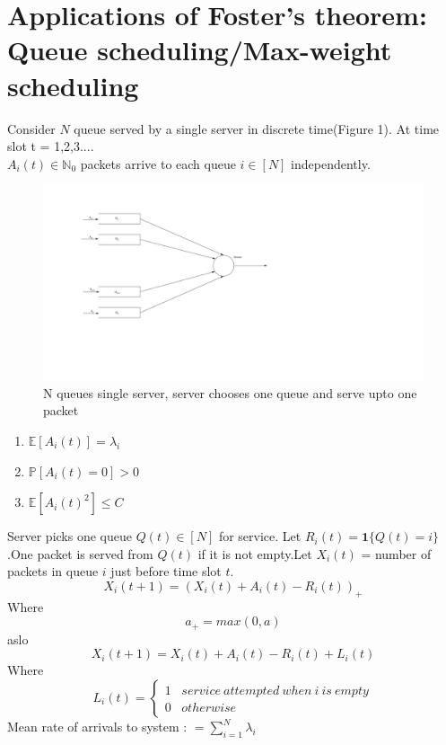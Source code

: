 \documentclass[a4paper,10pt,english]{article}
\begin{document}
\section{Applications of Foster's theorem: Queue scheduling/Max-weight scheduling}
Consider $N$ queue served by a single server in discrete time(Figure 1).
At time slot t = 1,2,3....\\
$A_i(t) \in \mathbb{N}_0$ packets arrive to each queue $i \in [N]$ independently.\\
\begin{figure}
\centering
\includegraphics[scale=0.6]{Figures/saa.png}
\caption{N queues single server, server chooses one queue and serve upto one packet}
\label{fig: example 1.1}
\end{figure}
\begin{enumerate}
\item $\mathbb{E}[A_i(t)] = \lambda _i$
\item $\mathbb{P}[A_i(t)=0] > 0$
\item $\mathbb{E}[A_i(t)^2] \leq C$
\end{enumerate}
Server picks one queue $Q(t) \in [N]$ for service. Let $R_i(t) =  \boldsymbol{1}\{Q(t) = i\}$.One packet is served from $Q(t)$ if it is not empty.Let $X_i(t)$ = number of packets in queue $i$ just before time slot $t$.\\
\[X_i(t+1) = (X_i(t) + A_i(t) - R_i(t))_+\]
Where \[a_+ = max(0,a)\]
aslo \[X_i(t+1) = X_i(t) + A_i(t) - R_i(t) + L_i(t)       \]Where 
\begin{equation*}
L_i(t) = 
\begin{cases}
  1 \ \ \ \,service \ attempted \ when \ i \ is \ empty\\
  0 \ \ \ \,otherwise 
\end{cases}
\end{equation*}
Mean rate of arrivals to system : $= \sum_{i=1}^{N} \lambda _i
$\\
\end{document}
